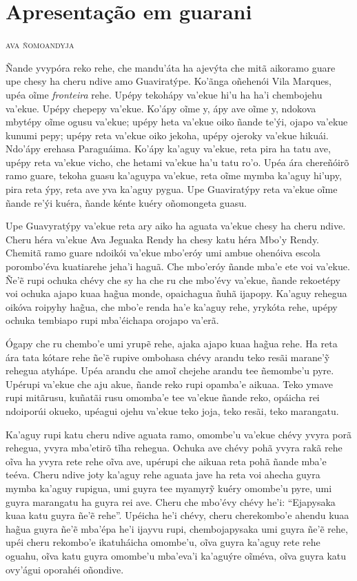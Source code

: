 \chapter*{Apresentação em guarani\smallskip{}}

\begin{flushright}
\textsc{ava ñomoandyja}
\end{flushright}

\noindent{}Ñande yvypóra reko rehe, che mandu'áta ha ajevýta che mitã aikoramo
guare upe chesy ha cheru ndive amo Guaviratýpe. Ko'ãnga oñehenói Vila
Marques, upéa oĩme \textit{fronteira} rehe. Upépy tekohápy va'ekue hi'u ha
ha'i chembojehu va'ekue. Upépy chepepy va'ekue. Ko'ápy oĩme y, ápy ave
oĩme y, ndokova mbytépy oĩme ogusu va'ekue; upépy heta va'ekue oiko
ñande te'ýi, ojapo va'ekue kunumi pepy; upépy reta va'ekue oiko jekoha,
upépy ojeroky va'ekue hikuái. Ndo'ápy erehasa Paraguáima. Ko'ápy ka'aguy
va'ekue, reta pira ha tatu ave, upépy reta va'ekue vicho, che hetami
va'ekue ha'u tatu ro'o. Upéa ára chereñóirõ ramo guare, tekoha guasu
ka'aguypa va'ekue, reta oĩme mymba ka'aguy hi'upy, pira reta ýpy, reta
ave yva ka'aguy pygua. Upe Guaviratýpy reta va'ekue oĩme ñande re'ýi
kuéra, ñande kénte kuéry oñomongeta guasu.

Upe Guavyratýpy va'ekue reta ary aiko ha aguata va'ekue chesy ha cheru
ndive. Cheru héra va'ekue Ava Jeguaka Rendy ha chesy katu héra Mbo'y
Rendy. Chemitã ramo guare ndoikói va'ekue mbo'eróy umi ambue ohenóiva
escola porombo'éva kuatiarehe jeha'i haguã. Che mbo'eróy ñande mba'e ete
voi va'ekue. Ñe'ẽ rupi ochuka chévy che sy ha che ru che mbo'évy
va'ekue, ñande rekoetépy voi ochuka ajapo kuaa hag̃ua monde, opaichagua
ñuhã ijapopy. Ka'aguy rehegua oikóva roipyhy hag̃ua, che mbo'e renda ha'e
ka'aguy rehe, yrykóta rehe, upépy ochuka tembiapo rupi mba'éichapa
orojapo va'erã.

Ógapy che ru chembo'e umi yrupẽ rehe, ajaka ajapo kuaa hag̃ua rehe. Ha
reta ára tata kótare rehe ñe'ẽ rupive ombohasa chévy arandu teko resãi
marane'ỹ rehegua atyhápe. Upéa arandu che amoĩ chejehe arandu tee
ñemombe'u pyre. Upérupi va'ekue che aju akue, ñande reko rupi opamba'e
aikuaa. Teko ymave rupi mitãrusu, kuñatãi rusu omomba'e tee va'ekue
ñande reko, opáicha rei ndoiporúi okueko, upéagui ojehu va'ekue teko
joja, teko resãi, teko marangatu.

Ka'aguy rupi katu cheru ndive aguata ramo, omombe'u va'ekue chévy yvyra
porã rehegua, yvyra mba'etirõ tĩha rehegua. Ochuka ave chévy pohã yvyra
rakã rehe oĩva ha yvyra rete rehe oĩva ave, upérupi che aikuaa reta pohã
ñande mba'e teéva. Cheru ndive joty ka'aguy rehe aguata jave ha reta voi
ahecha guyra mymba ka'aguy rupigua, umi guyra tee myamyrỹ kuéry omombe'u
pyre, umi guyra marangatu ha guyra rei ave. Cheru che mbo'évy chévy
he'i: ``Ejapysaka kuaa katu guyra ñe'ẽ rehe''. Upéicha he'i chévy, cheru
cherekombo'e ahendu kuaa hag̃ua guyra ñe'ẽ mba'épa he'i ijayvu rupi,
chembojapysaka umi guyra ñe'ẽ rehe, upéi cheru rekombo'e ikatuháicha
omombe'u, oĩva guyra ka'aguy rete rehe oguahu, oĩva katu guyra omombe'u
mba'eva'i ka'aguýre oĩméva, oĩva guyra katu ovy'águi oporahéi oñondive.

